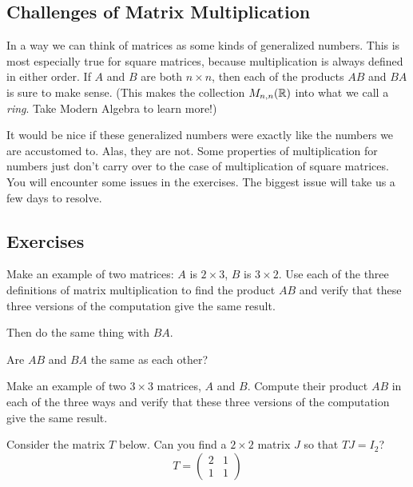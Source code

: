\documentclass[elementsmain.tex]{subfiles}
\begin{document}
\subsection*{Challenges of Matrix Multiplication}

In a way we can think of matrices as some kinds of generalized numbers. This is most especially true for square matrices, because multiplication is always defined in either order. If $A$ and $B$ are both $n\times n$, then each of the products $AB$ and $BA$ is sure to make sense. (This makes the collection $M_{n,n}(\mathbb{R})$ into what we call a \emph{ring}. Take Modern Algebra to learn more!)


It would be nice if these generalized numbers were exactly like the numbers we are accustomed to. Alas, they are not. Some properties of multiplication for numbers just don't carry over to the case of multiplication of square matrices. You will encounter some issues in the exercises. The biggest issue will take us a few days to resolve. 



\clearpage
\subsection*{Exercises}

\begin{exercise} Make an example of two matrices: $A$ is $2\times 3$, $B$ is $3\times 2$. Use each of the three definitions of matrix multiplication to find the product $AB$ and verify that these three versions of the computation give the same result. 

Then do the same thing with $BA$. 

Are $AB$ and $BA$ the same as each other?
\end{exercise}

\begin{exercise} Make an example of two $3\times 3$ matrices, $A$ and $B$. Compute their product $AB$ in each of the three ways and verify that these three versions of the computation give the same result.
\end{exercise}

\begin{exercise} Consider the matrix $T$ below. Can you find a $2\times 2$ matrix $J$ so that $TJ=I_2$?
\[
T = \begin{pmatrix} 2 & 1 \\ 1 & 1 \end{pmatrix}
\]
\end{exercise}
\end{document}
